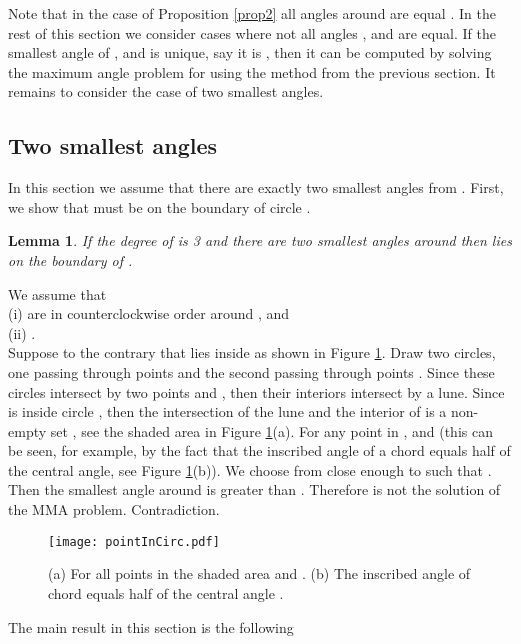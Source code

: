 \documentclass[10pt]{article}
\newtheorem{lemma}[theorem]{Lemma}
\newenvironment{proof}{\begingroup\Proof}{\qed\endgroup}
\def\Proof{\noindent{\bf Proof\/:}\nobreak}
\def\qed{\unskip~{\vrule height 4pt depth 0pt width 4pt}\medbreak}
\begin{document}
Note that in the case of Proposition \ref{prop2} all angles around  are equal 
.  
In the rest of this section we consider cases where not all angles 
,  and  are equal. 
If the smallest angle of ,  and 
is unique, say it is , then it can be computed by solving the maximum angle problem for  using the method from the previous section.
It remains to consider the case of two smallest angles.

\subsection{Two smallest angles} \label{twomin}

In this section we assume that there are exactly two smallest angles from . First, we show that  must be on the boundary of circle . 

\begin{lemma} \label{lemma2angles}
If the degree of  is 3 and there are two smallest angles around  then  lies on the boundary of . 
\end{lemma}

\begin{proof}
We assume that \\
(i)  are in counterclockwise order around , and \\
(ii) .\\
Suppose to the contrary that  lies inside  as shown in Figure \ref{pointInCirc}.
Draw two circles, one passing through points  and the second passing through points . Since these circles intersect by two points  and , then their interiors intersect by a lune. 
Since  is inside circle , then the intersection of the lune and the interior of  is  a non-empty set , see the shaded area in Figure \ref{pointInCirc}(a).
For any point  in ,  and  
(this can be seen, for example, by the fact that the inscribed angle of a chord equals half of the central angle, see Figure \ref{pointInCirc}(b)).
We choose  from  close enough to  such that . Then the smallest angle around  is greater than . 
Therefore  is not the solution of the MMA problem. Contradiction.
\end{proof}
 
\begin{figure}[htp]
\centering
\texttt{[image: pointInCirc.pdf]}
\caption{(a) For all points  in the shaded area  and .  (b)  The inscribed angle  of chord  equals half of the central angle .}
\label{pointInCirc}
\end{figure}

The main result in this section is the following
\end{document}
